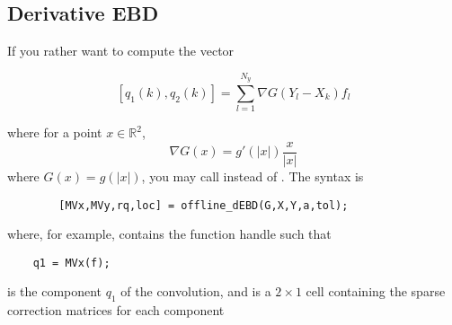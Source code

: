 \documentclass[]{article}
\begin{document}
\begin{itemize}
	\subsection{Derivative EBD}
	
	If you rather want to compute the vector
	
	\[[q_1(k),q_2(k)] = \sum_{l=1}^{N_y} \nabla{G}(Y_l - X_k)f_l\]
	
	where for a point $x \in \mathbb{R}^2$, 
	\[\nabla G(x) = g'(|x|) \frac{x}{|x|}\]
	where $G(x) = g(|x|)$, you may call  instead of . The syntax is 
	\begin{lstlisting}
		[MVx,MVy,rq,loc] = offline_dEBD(G,X,Y,a,tol);
	\end{lstlisting}
	where, for example,  contains the function handle such that 
	\begin{lstlisting}
	q1 = MVx(f);
	\end{lstlisting}
	is the component $q_1$ of the convolution, and  is a $2\times1$ cell containing the sparse correction matrices for each component
		
\end{itemize}
\end{document}

